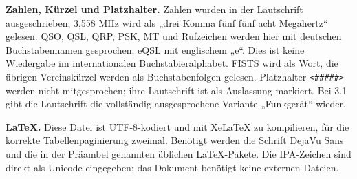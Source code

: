 \documentclass[a4paper,landscape,10pt]{article}
\begin{document}
\medskip
\textbf{Zahlen, Kürzel und Platzhalter.} Zahlen wurden in der Lautschrift ausgeschrieben;
3,558 MHz wird als „drei Komma fünf fünf acht Megahertz“ gelesen. QSO, QSL, QRP, PSK, MT und
Rufzeichen werden hier mit deutschen Buchstabennamen gesprochen; eQSL mit englischem „e“.
Dies ist keine Wiedergabe im internationalen Buchstabieralphabet. FISTS wird als Wort, die übrigen Vereinskürzel werden als Buchstabenfolgen gelesen. Platzhalter \texttt{<\#\#\#\#\#>} werden
nicht mitgesprochen; ihre Lautschrift ist als Auslassung markiert. Bei 3.1 gibt die Lautschrift die
vollständig ausgesprochene Variante „Funkgerät“ wieder.

\medskip
\textbf{LaTeX.} Diese Datei ist UTF-8-kodiert und mit XeLaTeX zu kompilieren, für die korrekte
Tabellenpaginierung zweimal. Benötigt werden die Schrift DejaVu Sans und die in der Präambel genannten
üblichen LaTeX-Pakete. Die IPA-Zeichen sind direkt als Unicode eingegeben; das Dokument benötigt
keine externen Dateien.
\end{document}
